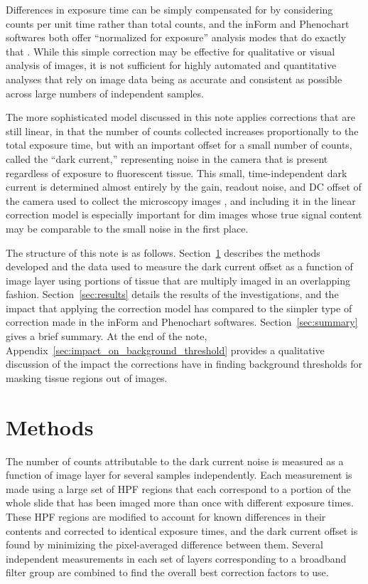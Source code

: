 \documentclass[letterpaper,11pt]{article}
\newcommand{\refsec}[1]{Section~\ref{#1}}
\begin{document}
Differences in exposure time can be simply compensated for by considering counts per unit time rather than total counts, and the inForm and Phenochart softwares both offer ``normalized for exposure'' analysis modes that do exactly that \cite{inform_user_manual,phenochart_user_manual}. While this simple correction may be effective for qualitative or visual analysis of images, it is not sufficient for highly automated and quantitative analyses that rely on image data being as accurate and consistent as possible across large numbers of independent samples. 

The more sophisticated model discussed in this note applies corrections that are still linear, in that the number of counts collected increases proportionally to the total exposure time, but with an important offset for a small number of counts, called the ``dark current,'' representing noise in the camera that is present regardless of exposure to fluorescent tissue. This small, time-independent dark current is determined almost entirely by the gain, readout noise, and DC offset of the camera used to collect the microscopy images \cite{doi:10.1111/j.1365-2818.2011.03581.x}, and including it in the linear correction model is especially important for dim images whose true signal content may be comparable to the small noise in the first place.

The structure of this note is as follows. \refsec{sec:methods} describes the methods developed and the data used to measure the dark current offset as a function of image layer using portions of tissue that are multiply imaged in an overlapping fashion. \refsec{sec:results} details the results of the investigations, and the impact that applying the correction model has compared to the simpler type of correction made in the inForm and Phenochart softwares. \refsec{sec:summary} gives a brief summary. At the end of the note, Appendix~\ref{sec:impact_on_background_threshold} provides a qualitative discussion of the impact the corrections have in finding background thresholds for masking tissue regions out of images.

\section{Methods}
\label{sec:methods}

The number of counts attributable to the dark current noise is measured as a function of image layer for several samples independently. Each measurement is made using a large set of HPF regions that each correspond to a portion of the whole slide that has been imaged more than once with different exposure times. These HPF regions are modified to account for known differences in their contents and corrected to identical exposure times, and the dark current offset is found by minimizing the pixel-averaged difference between them. Several independent measurements in each set of layers corresponding to a broadband filter group are combined to find the overall best correction factors to use. 
\end{document}
